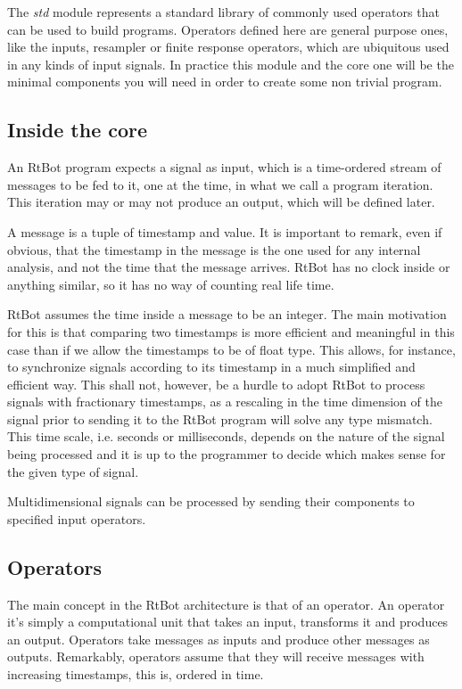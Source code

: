 \documentclass[preprint,1p,times]{elsarticle}
\begin{document}
The \textit{std} module represents a standard library of commonly used operators that can 
be used to build programs. Operators defined here are general purpose ones, like 
the inputs, resampler or finite response operators, which are ubiquitous used in 
any kinds of input signals. In practice this module and the core one will be the 
minimal components you will need in order to create some non trivial program.

\subsection{Inside the core}
An RtBot program expects a signal as input, which is a time-ordered stream of 
messages to be fed to it, one at the time, in what we call a program iteration. 
This iteration may or may not produce an output, which will be defined later.

A message is a tuple of timestamp and value. It is important to remark, even if 
obvious, that the timestamp in the message is the one used for any internal 
analysis, and not the time that the message arrives. RtBot has no clock inside or 
anything similar, so it has no way of counting real life time.


RtBot assumes the time inside a message to be an integer. The main motivation for 
this is that comparing two timestamps is more efficient and meaningful in this 
case than if we allow the timestamps to be of float type. This allows, for 
instance, to synchronize signals according to its timestamp in a much simplified 
and efficient way. This shall not, however, be a hurdle to adopt RtBot to process 
signals with fractionary timestamps, as a rescaling in the time dimension of the 
signal prior to sending it to the RtBot program will solve any type mismatch. This 
time scale, i.e. seconds or milliseconds, depends on the nature of the signal 
being processed and it is up to the programmer to decide which makes sense for the 
given type of signal.


Multidimensional signals can be processed by sending their components to specified input operators.

\subsection{Operators}
The main concept in the RtBot architecture is that of an operator. An operator 
it’s simply a computational unit that takes an input, transforms it and produces 
an output. Operators take messages as inputs and produce other messages as 
outputs. Remarkably, operators assume that they will receive messages with 
increasing timestamps, this is, ordered in time.
\end{document}
